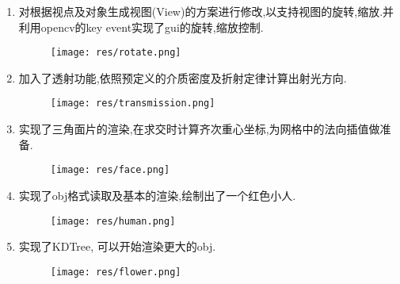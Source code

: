 \begin{enumerate}
\item 对根据视点及对象生成视图(View)的方案进行修改,以支持视图的旋转,缩放.并利用opencv的key event实现了gui的旋转,缩放控制.
\begin{figure}[H]
  \centering
  \texttt{[image: res/rotate.png]}
  \caption{\label{fig:rotate}}
\end{figure}

\item 加入了透射功能,依照预定义的介质密度及折射定律计算出射光方向.
\begin{figure}[H]
  \centering
  \texttt{[image: res/transmission.png]}
  \caption{\label{fig:transmission}}
\end{figure}

\item 实现了三角面片的渲染,在求交时计算齐次重心坐标,为网格中的法向插值做准备.
\begin{figure}[H]
  \centering
  \texttt{[image: res/face.png]}
  \caption{\label{fig:face}}
\end{figure}

\item 实现了obj格式读取及基本的渲染,绘制出了一个红色小人.
\begin{figure}[H]
  \centering
  \texttt{[image: res/human.png]}
  \caption{\label{fig:human}}
\end{figure}

\item 实现了KDTree, 可以开始渲染更大的obj.
\begin{figure}[H]
  \centering
  \texttt{[image: res/flower.png]}
  \caption{\label{fig:flower}}
\end{figure}



\end{enumerate}
